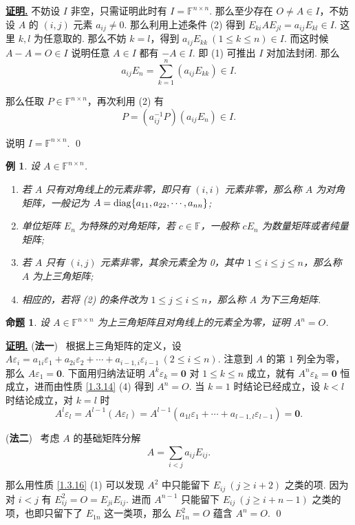 \documentclass[10pt,openany]{article}
\theoremstyle{thmstyle} %
\theoremstyle{defstyle} %
\theoremstyle{prostyle} %
\newtheorem{proposition}[theorem]{命题}
\theoremstyle{exastyle}
\newtheorem{example}[theorem]{例}
\theoremstyle{remstyle}
\renewenvironment{proof}[1][证明]{\par\underline{\textbf{#1.}} \;\fangsong}{\qed\par}
\newcommand{\F}{\mathbb{F}}
\begin{document}
\begin{proof}
	不妨设 \( I \) 非空，只需证明此时有 \( I=\F^{n \times n} \). 那么至少存在 \( O \neq A \in I \)，不妨设 \( A \) 的 \( (i,j)\) 元素 \( a_{ij} \neq 0 \). 那么利用上述条件 (2) 得到 \( E_{ki}AE_{jl}=a_{ij}E_{kl} \in I \). 这里 \( k,l \) 为任意取的. 那么不妨 \( k=l \)，得到 \( a_{ij}E_{kk} \ (1 \leq k \leq n) \in I \). 而这时候 \( A-A=O \in I \) 说明任意 \( A \in I  \) 都有 \( -A \in I \). 即 (1) 可推出 \( I \) 对加法封闭. 那么
	\[ a_{ij}E_n=\sum_{k=1}^{n} (a_{ij}E_{kk}) \in I. \]
	
	那么任取 \( P \in \F^{n \times n} \)，再次利用 (2) 有 
	\[ P= (a_{ij}^{-1}P)(a_{ij}E_n) \in I. \]
	
	说明 \( I=\F^{n \times n} \).
\end{proof}

\begin{example}
	设 \( A \in \F^{n \times n} \).
	\begin{enumerate}[(1)]
		\item 若 \( A \) 只有对角线上的元素非零，即只有 \( (i,i) \) 元素非零，那么称 \( A \) 为对角矩阵，一般记为 \( A=\mathrm{diag}\{a_{11},a_{22},\cdots \\ ,a_{nn} \} \);
		\item 单位矩阵 \( E_n \) 为特殊的对角矩阵，若 \( c \in \F \)，一般称 \( cE_n \) 为数量矩阵或者纯量矩阵;
		\item 若 \( A \) 只有 \( (i,j) \) 元素非零，其余元素全为 0，其中 \( 1 \leq i \leq j \leq n \)，那么称 \( A \) 为上三角矩阵;
		\item 相应的，若将 (2) 的条件改为 \( 1 \leq j \leq i \leq n \)，那么称 \( A \) 为下三角矩阵.
	\end{enumerate}
\end{example}

\begin{proposition}
	设 \( A \in \F^{n \times n} \) 为上三角矩阵且对角线上的元素全为零，证明 \( A^n=O \).
	\label{1.3.19}
\end{proposition}

\begin{proof}
	(\textbf{法一}) \ 根据上三角矩阵的定义，设 \( A\varepsilon_i=a_{1i}\varepsilon_1+a_{2i}\varepsilon_2+\cdots+a_{i-1,i}\varepsilon_{i-1} \ (2 \leq i \leq n)\). 注意到 \( A \) 的第 \( 1 \) 列全为零，那么 \( A\varepsilon_1=\bm{0} \). 下面用归纳法证明 \( A^k\varepsilon_k=\bm{0} \) 对 \( 1 \leq k \leq n \) 成立，就有 \( A^n\varepsilon_k =\bm{0} \) 恒成立，进而由性质 \ref{1.3.14} (4) 得到 \( A^n=O \). 当 \( k=1 \) 时结论已经成立，设 \( k<l \) 时结论成立，对 \( k=l \) 时
	\[ A^l\varepsilon_l= A^{l-1}(A\varepsilon_l)=A^{l-1}(a_{1l}\varepsilon_1+\cdots+a_{l-1,l}\varepsilon_{l-1})=\bm{0}. \]
	
	(\textbf{法二}) \ 考虑 \( A \) 的基础矩阵分解
	\[ A=\sum_{i < j}^{} a_{ij}E_{ij}. \]
	
	那么用性质 \ref{1.3.16} (1) 可以发现 \( A^2 \) 中只能留下 \( E_{ij} \ (j \geq i+2) \) 之类的项. 因为对 \( i<j \) 有 \( E_{ij}^2=O=E_{ji}E_{ij} \). 进而 \( A^{n-1} \) 只能留下 \( E_{ij} \ (j \geq i+n-1) \) 之类的项，也即只留下了 \( E_{1n} \) 这一类项，那么 \( E_{1n}^2=O \) 蕴含 \( A^n=O \).
\end{proof}
\end{document}
